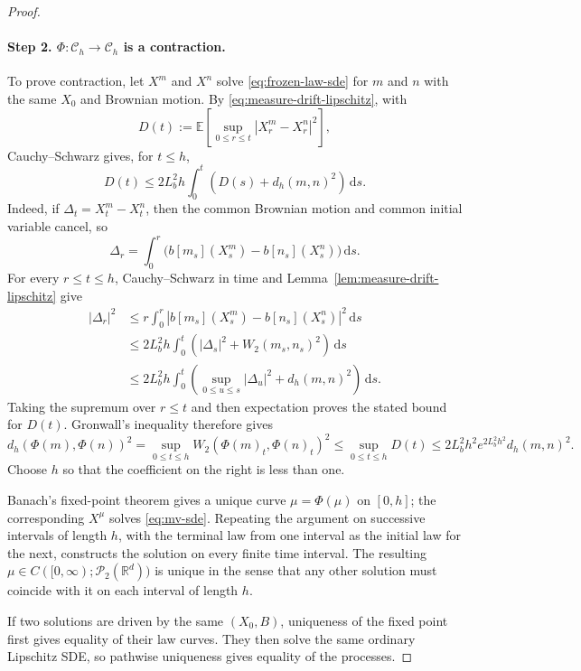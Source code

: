\documentclass[11pt]{amsart}
\numberwithin{equation}{section}
\theoremstyle{plain}
\newcommand{\R}{\mathbb{R}}
\newcommand{\E}{\mathbb{E}}
\newcommand{\cP}{\mathcal{P}}
\newcommand{\dd}{\,\mathrm{d}}
\newcommand{\abs}[1]{\left\lvert#1\right\rvert}
\begin{document}
\begin{proof}
\paragraph{\textbf{Step 2. $\Phi:\mathcal C_h\to\mathcal C_h$ is a contraction.}}
To prove contraction, let $X^m$ and $X^n$ solve \eqref{eq:frozen-law-sde} for $m$ and $n$ with the same $X_0$ and Brownian motion.  By \eqref{eq:measure-drift-lipschitz}, with
\[
 D(t):=\E\left[\sup_{0\leq r\leq t}\abs{X_r^m-X_r^n}^2\right],
\]
Cauchy--Schwarz gives, for $t\leq h$,
\[
 D(t)
 \leq 2L_b^2h\int_0^t
       \left(D(s)+d_h(m,n)^2\right)\dd s.
\]
Indeed, if $\Delta_t=X_t^m-X_t^n$, then the common Brownian motion and common
initial variable cancel, so
\[
 \Delta_r=\int_0^r
 \bigl(b[m_s](X_s^m)-b[n_s](X_s^n)\bigr)\dd s.
\]
For every $r\leq t\leq h$, Cauchy--Schwarz in time and
Lemma~\ref{lem:measure-drift-lipschitz} give
\begin{align*}
 \abs{\Delta_r}^2
 &\leq r\int_0^r
 \abs{b[m_s](X_s^m)-b[n_s](X_s^n)}^2\dd s\\
 &\leq 2L_b^2h\int_0^t
 \left(\abs{\Delta_s}^2+W_2(m_s,n_s)^2\right)\dd s\\
 &\leq 2L_b^2h\int_0^t
 \left(\sup_{0\leq u\leq s}\abs{\Delta_u}^2
       +d_h(m,n)^2\right)\dd s.
\end{align*}
Taking the supremum over $r\leq t$ and then expectation proves the stated
bound for $D(t)$.
Gronwall's inequality therefore gives
\begin{equation}\label{eq:phi-contraction}
 d_h(\Phi(m),\Phi(n))^2
 = \sup_{0\leq t\leq h}W_2(\Phi(m)_t,\Phi(n)_t)^2
 \leq \sup_{0\leq t\leq h}D(t)  
 \leq 2L_b^2h^2e^{2L_b^2h^2}d_h(m,n)^2.
\end{equation}
Choose $h$ so that the coefficient on the right is less than one. 

 Banach's fixed-point theorem gives a unique curve $\mu=\Phi(\mu)$ on $[0,h]$; the corresponding $X^\mu$ solves \eqref{eq:mv-sde}.  Repeating the argument on successive intervals of length $h$, with the terminal law from one interval as the initial law for the next, constructs the solution on every finite time interval. The resulting $\mu\in C([0,\infty);\cP_2(\R^d))$ is unique in the sense that any other solution must coincide with it on each interval of length $h$.  

If two solutions are driven by the same $(X_0,B)$, uniqueness of the fixed
point first gives equality of their law curves.  They then solve the same
ordinary Lipschitz SDE, so pathwise uniqueness gives equality of the
processes.


\end{proof}
\end{document}
